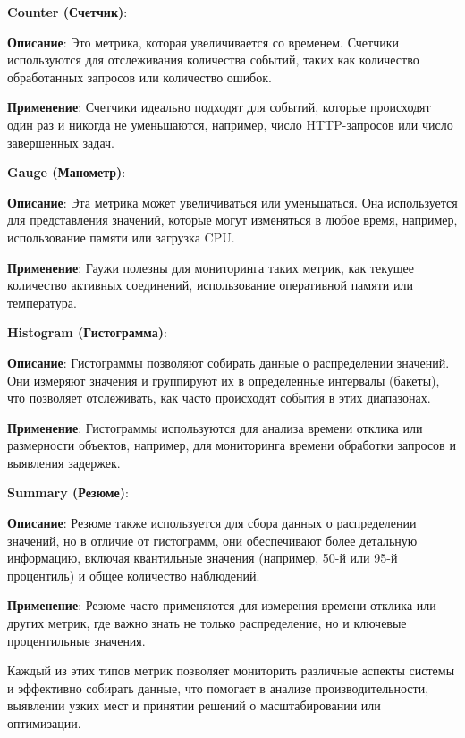 \textbf{Counter (Счетчик)}: \par
\textbf{Описание}: Это метрика, которая увеличивается со временем.
Счетчики используются для отслеживания количества событий, таких как количество обработанных запросов
или количество ошибок. \par
\textbf{Применение}: Счетчики идеально подходят для событий, которые происходят один раз и никогда не уменьшаются,
например, число HTTP-запросов или число завершенных задач. \par

\textbf{Gauge (Манометр)}:\par
\textbf{Описание}: Эта метрика может увеличиваться или уменьшаться. Она используется для представления значений, которые могут изменяться в любое время, например, использование памяти или загрузка CPU.\par
\textbf{Применение}: Гаужи полезны для мониторинга таких метрик, как текущее количество активных соединений, использование оперативной памяти или температура.\par

\textbf{Histogram (Гистограмма)}:\par
\textbf{Описание}: Гистограммы позволяют собирать данные о распределении значений. Они измеряют значения и группируют их в определенные интервалы (бакеты), что позволяет отслеживать, как часто происходят события в этих диапазонах.\par
\textbf{Применение}: Гистограммы используются для анализа времени отклика или размерности объектов, например, для мониторинга времени обработки запросов и выявления задержек.\par

\textbf{Summary (Резюме)}:\par
\textbf{Описание}: Резюме также используется для сбора данных о распределении значений, но в отличие от гистограмм, они обеспечивают более детальную информацию, включая квантильные значения (например, 50-й или 95-й процентиль) и общее количество наблюдений.\par
\textbf{Применение}: Резюме часто применяются для измерения времени отклика или других метрик, где важно знать не только распределение, но и ключевые процентильные значения.\par

Каждый из этих типов метрик позволяет мониторить различные аспекты системы и эффективно собирать данные, что помогает в анализе производительности, выявлении узких мест и принятии решений о масштабировании или оптимизации.

